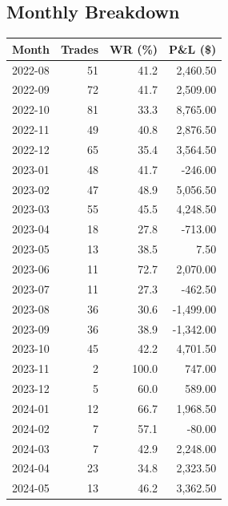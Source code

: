 \documentclass[11pt,a4paper,twoside]{article}
\begin{document}
\subsection*{Monthly Breakdown}
\noindent\begin{center}
\begin{tabular}{>{\color{txtmain}}l rrr}
\toprule
\rowcolor{cardbg}
\textbf{Month} & \textbf{Trades} & \textbf{WR (\%)} & \textbf{P\&L (\$)} \\
\midrule
2022-08 & 51 & 41.2 & \textcolor{wingreen}{2,460.50} \\
2022-09 & 72 & 41.7 & \textcolor{wingreen}{2,509.00} \\
2022-10 & 81 & 33.3 & \textcolor{wingreen}{8,765.00} \\
2022-11 & 49 & 40.8 & \textcolor{wingreen}{2,876.50} \\
2022-12 & 65 & 35.4 & \textcolor{wingreen}{3,564.50} \\
2023-01 & 48 & 41.7 & \textcolor{lossred}{-246.00} \\
2023-02 & 47 & 48.9 & \textcolor{wingreen}{5,056.50} \\
2023-03 & 55 & 45.5 & \textcolor{wingreen}{4,248.50} \\
2023-04 & 18 & 27.8 & \textcolor{lossred}{-713.00} \\
2023-05 & 13 & 38.5 & \textcolor{wingreen}{7.50} \\
2023-06 & 11 & 72.7 & \textcolor{wingreen}{2,070.00} \\
2023-07 & 11 & 27.3 & \textcolor{lossred}{-462.50} \\
2023-08 & 36 & 30.6 & \textcolor{lossred}{-1,499.00} \\
2023-09 & 36 & 38.9 & \textcolor{lossred}{-1,342.00} \\
2023-10 & 45 & 42.2 & \textcolor{wingreen}{4,701.50} \\
2023-11 & 2 & 100.0 & \textcolor{wingreen}{747.00} \\
2023-12 & 5 & 60.0 & \textcolor{wingreen}{589.00} \\
2024-01 & 12 & 66.7 & \textcolor{wingreen}{1,968.50} \\
2024-02 & 7 & 57.1 & \textcolor{lossred}{-80.00} \\
2024-03 & 7 & 42.9 & \textcolor{wingreen}{2,248.00} \\
2024-04 & 23 & 34.8 & \textcolor{wingreen}{2,323.50} \\
2024-05 & 13 & 46.2 & \textcolor{wingreen}{3,362.50} \\

\end{tabular}
\end{center}
\end{document}
